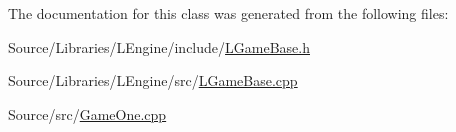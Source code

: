 The documentation for this class was generated from the following files\-:\begin{DoxyCompactItemize}
\item 
Source/\-Libraries/\-L\-Engine/include/\hyperlink{_l_game_base_8h}{L\-Game\-Base.\-h}\item 
Source/\-Libraries/\-L\-Engine/src/\hyperlink{_l_game_base_8cpp}{L\-Game\-Base.\-cpp}\item 
Source/src/\hyperlink{_game_one_8cpp}{Game\-One.\-cpp}\end{DoxyCompactItemize}
